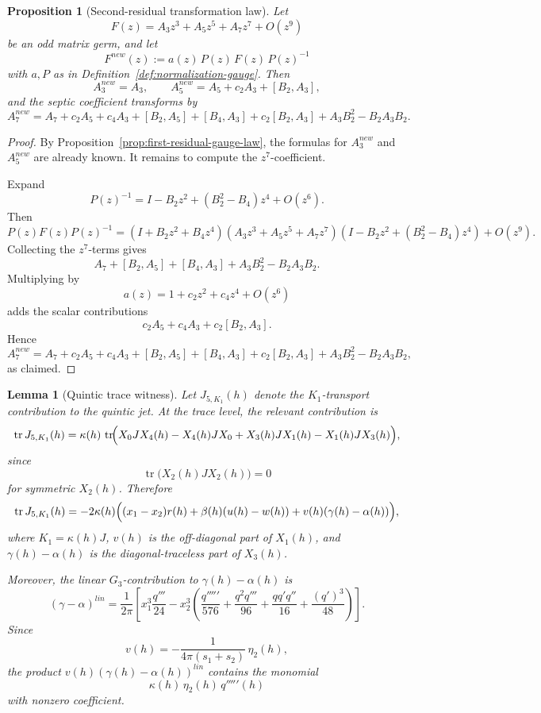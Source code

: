 \documentclass[11pt,a4paper]{amsart}
\def\lin{lin}%
\def\new{new}%
\theoremstyle{plain}
\newtheorem{proposition}[theorem]{Proposition}
\newtheorem{lemma}[theorem]{Lemma}
\theoremstyle{definition}
\newcommand{\lin}{\mathrm{lin}}
\newcommand{\new}{\mathrm{new}}
\begin{document}
\begin{proposition}[Second-residual transformation law]
\label{prop:second-residual-gauge-law}
Let
\[
F(z)=A_3 z^3+A_5 z^5+A_7 z^7+O(z^9)
\]
be an odd matrix germ, and let
\[
F^{\new}(z):=a(z)\,P(z)\,F(z)\,P(z)^{-1}
\]
with $a,P$ as in Definition~\ref{def:normalization-gauge}. Then
\[
A_3^{\new}=A_3,
\qquad
A_5^{\new}=A_5+c_2A_3+[B_2,A_3],
\]
and the septic coefficient transforms by
\[
A_7^{\new}
=
A_7+c_2A_5+c_4A_3+[B_2,A_5]+[B_4,A_3]
+c_2[B_2,A_3]+A_3B_2^2-B_2A_3B_2.
\]
\end{proposition}

\begin{proof}
By Proposition~\ref{prop:first-residual-gauge-law}, the formulas for
$A_3^{\new}$ and $A_5^{\new}$ are already known. It remains to compute the
$z^7$-coefficient.

Expand
\[
P(z)^{-1}=I-B_2 z^2+(B_2^2-B_4)z^4+O(z^6).
\]
Then
\[
P(z)F(z)P(z)^{-1}
=
(I+B_2 z^2+B_4 z^4)(A_3 z^3+A_5 z^5+A_7 z^7)
(I-B_2 z^2+(B_2^2-B_4)z^4)+O(z^9).
\]
Collecting the $z^7$-terms gives
\[
A_7+[B_2,A_5]+[B_4,A_3]+A_3B_2^2-B_2A_3B_2.
\]
Multiplying by
\[
a(z)=1+c_2 z^2+c_4 z^4+O(z^6)
\]
adds the scalar contributions
\[
c_2A_5+c_4A_3+c_2[B_2,A_3].
\]
Hence
\[
A_7^{\new}
=
A_7+c_2A_5+c_4A_3+[B_2,A_5]+[B_4,A_3]
+c_2[B_2,A_3]+A_3B_2^2-B_2A_3B_2,
\]
as claimed.
\end{proof}

\begin{lemma}[Quintic trace witness]
\label{lem:quintic-trace-witness}
Let $J_{5,K_1}(h)$ denote the $K_1$-transport contribution to the quintic
jet. At the trace level, the relevant contribution is
\[
\operatorname{tr}J_{5,K_1}(h)
=
\kappa(h)\,\operatorname{tr}\!\Bigl(
X_0JX_4(h)-X_4(h)JX_0
+
X_3(h)JX_1(h)-X_1(h)JX_3(h)
\Bigr),
\]
since
\[
\operatorname{tr}\bigl(X_2(h)JX_2(h)\bigr)=0
\]
for symmetric $X_2(h)$. Therefore
\[
\operatorname{tr}J_{5,K_1}(h)
=
-2\kappa(h)\Bigl((x_1-x_2)r(h)+\beta(h)(u(h)-w(h))+v(h)(\gamma(h)-\alpha(h))\Bigr),
\]
where $K_1=\kappa(h)J$, $v(h)$ is the off-diagonal part of $X_1(h)$,
and $\gamma(h)-\alpha(h)$ is the diagonal-traceless part of $X_3(h)$.

Moreover, the linear $G_3$-contribution to $\gamma(h)-\alpha(h)$ is
\[
(\gamma-\alpha)^{\lin}
=
\frac{1}{2\pi}\left[
x_1^3\frac{q'''}{24}
-
x_2^3\left(
\frac{q'''''}{576}
+\frac{q^2q'''}{96}
+\frac{qq'q''}{16}
+\frac{(q')^3}{48}
\right)
\right].
\]
Since
\[
v(h)=-\frac{1}{4\pi(s_1+s_2)}\,\eta_2(h),
\]
the product $v(h)(\gamma(h)-\alpha(h))^{\lin}$ contains the monomial
\[
\kappa(h)\,\eta_2(h)\,q'''''\!(h)
\]
with nonzero coefficient.
\end{lemma}
\end{document}
